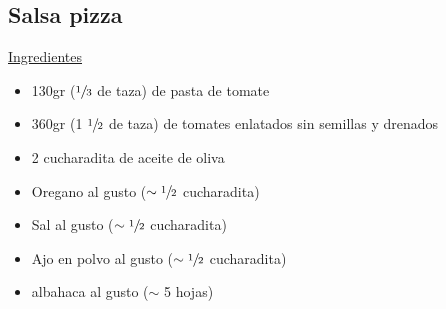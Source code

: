 \subsection{Salsa pizza}

\underline{Ingredientes}

\begin{itemize}
\item 130gr ($\sfrac{1}{3}$ de taza) de pasta de tomate
\item 360gr  (1 $\sfrac{1}{2}$ de taza) de tomates enlatados sin semillas y drenados
\item 2 cucharadita de aceite de oliva
\item Oregano al gusto ($\sim\sfrac{1}{2}$ cucharadita)
\item Sal al gusto ($\sim\sfrac{1}{2}$ cucharadita)
\item Ajo en polvo al gusto ($\sim\sfrac{1}{2}$ cucharadita)
\item albahaca al gusto ($\sim$ 5 hojas)
\end{itemize}
